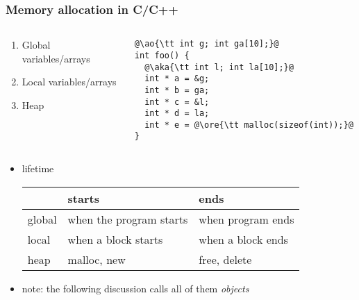 \documentclass[12pt,dvipdfmx]{beamer}
\newcommand{\ore}[1]{{\color{orange}#1}}
\newcommand{\ao}[1]{{\color{blue}#1}}
\newcommand{\aka}[1]{{\color{red}#1}}
\begin{document}
\begin{frame}[fragile]
  \frametitle{Memory allocation in C/C++}

  \begin{columns}
    \begin{column}{0.5\textwidth}
\begin{enumerate}
\item \ao{Global variables/arrays}
\item \aka{Local variables/arrays}
\item \ore{Heap}
\end{enumerate}
\end{column}    
\begin{column}{0.5\textwidth}
\begin{lstlisting}
@\ao{\tt int g; int ga[10];}@
int foo() {
  @\aka{\tt int l; int la[10];}@
  int * a = &g;
  int * b = ga;
  int * c = &l;
  int * d = la;
  int * e = @\ore{\tt malloc(sizeof(int));}@ 
}
\end{lstlisting}
\end{column}
\end{columns}

\begin{itemize}
\item lifetime
\begin{tabular}{|l|l|l|}\hline
            & starts        & ends \\\hline
\ao{global} & when the program starts & when program ends \\
\aka{local} & when a block starts & when a block ends \\
\ore{heap}  & malloc, new & free, delete \\\hline
\end{tabular}

\item note: the following discussion
  calls all of them {\it objects}
\end{itemize}
\end{frame}
\fi

\end{document}
